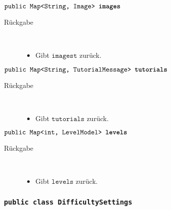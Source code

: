 \begin{description}
		\item $\texttt{public Map<String, Image> \textbf{images}}$\\ 
		\begin{description}
			\item[Rückgabe] \hfill \\
			\vspace{-.8cm}
			\begin{itemize}
				\item Gibt $\texttt{imagest}$ zurück.
			\end{itemize}
			\end{description}

		\item $\texttt{public Map<String, TutorialMessage> \textbf{tutorials}}$ \\ 
		\begin{description}
			\item[Rückgabe] \hfill \\
			\vspace{-.8cm}
			\begin{itemize}
				\item Gibt $\texttt{tutorials}$ zurück.
			\end{itemize}
			\end{description}
			
		\item $\texttt{public Map<int, LevelModel> \textbf{levels}}$ \\ 
		\begin{description}
			\item[Rückgabe] \hfill \\
			\vspace{-.8cm}
			\begin{itemize}
				\item Gibt $\texttt{levels}$ zurück.
			\end{itemize}
			\end{description}
			
	\end{description}
			
\subsubsection{\normalfont \texttt{public class \textbf{DifficultySettings}}}

